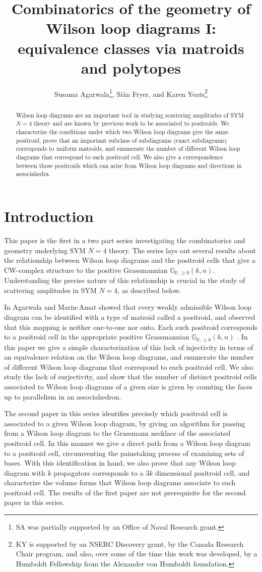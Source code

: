 \documentclass[11pt]{article}
\title{Combinatorics of the geometry of Wilson loop diagrams I: equivalence classes via matroids and polytopes}
\author{Susama Agarwala\thanks{SA was partially supported by an Office of Naval Research grant.}, Si\^an Fryer, and Karen Yeats\thanks{KY is supported by an NSERC Discovery grant, by the Canada Research Chair program, and also, over some of the time this work was developed, by a Humboldt Fellowship from the Alexander von Humboldt foundation.}}
\newcommand{\R}{\mathbb{R}}
\newcommand{\Gr}{\mathbb{G}_{\R, \geq 0}}
\theoremstyle{remark}
\theoremstyle{definition}
\begin{document}
\maketitle

\begin{abstract}
  Wilson loop diagrams are an important tool in studying scattering amplitudes of SYM $N=4$ theory and are known by previous work to be associated to positroids. We characterize the conditions under which two Wilson loop diagrams give the same positroid, prove that an important subclass of subdiagrams (exact subdiagrams) corresponds to uniform matroids, and enumerate the number of different Wilson loop diagrams that correspond to each positroid cell.  We also give a correspondence between those positroids which can arise from Wilson loop diagrams and directions in associahedra.
\end{abstract}



\section{Introduction}

This paper is the first in a two part series investigating the combinatorics and geometry underlying SYM $N=4$ theory. The series lays out several results about the relationship between Wilson loop diagrams and the positroid cells that give a CW-complex structure to the positive Grassmannian $\Gr(k,n)$. Understanding the precise nature of this relationship is crucial in the study of scattering amplitudes in SYM $N=4$, as described below.

In \cite{wilsonloop} Agarwala and Marin-Amat showed that every weakly admissible Wilson loop diagram can be identified with a type of matroid called a positroid, and observed that this mapping is neither one-to-one nor onto. Each such positroid corresponds to a positroid cell in the appropriate positive Grassmannian $\Gr(k,n)$ \cite{Postnikov}. In this paper we give a simple characterization of this lack of injectivity in terms of an equivalence relation on the Wilson loop diagrams, and enumerate the number of different Wilson loop diagrams that correspond to each positroid cell. We also study the lack of surjectivity, and show that the number of distinct positroid cells associated to Wilson loop diagrams of a given size is given by counting the faces up to parallelism in an associahedron. 

The second paper \cite{generalcombinatoricsII} in this series identifies precisely which positroid cell is associated to a given Wilson loop diagram, by giving an algorithm for passing from a Wilson loop diagram to the Grassmann necklace of the associated positroid cell. In this manner we give a direct path from a Wilson loop diagram to a positroid cell, circumventing the painstaking process of examining sets of bases. With this identification in hand, we also prove that any Wilson loop diagram with $k$ propagators corresponds to a $3k$ dimensional positroid cell, and characterize the volume forms that Wilson loop diagrams associate to each positroid cell. The results of the first paper are not prerequisite for the second paper in this series.
\end{document}
